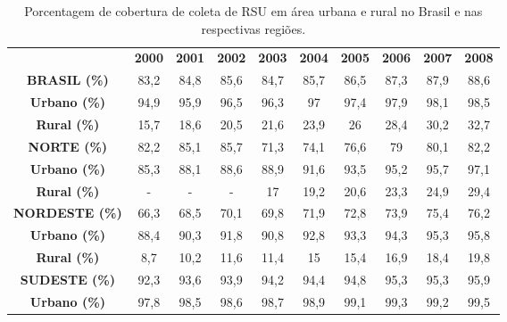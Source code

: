 \begin{table}[htbp]
  \centering
  \caption{Porcentagem de cobertura de coleta de RSU em área urbana e rural no Brasil e nas respectivas regiões.}
    \begin{tabular}{|c|c|c|c|c|c|c|c|c|c|}
\cmidrule{4-10}    \rowcolor[rgb]{ .969,  .588,  .275} \textcolor[rgb]{ 1,  1,  1}{} & \textcolor[rgb]{ 1,  1,  1}{\textbf{2000}} & \textcolor[rgb]{ 1,  1,  1}{\textbf{2001}} & \textcolor[rgb]{ 1,  1,  1}{\textbf{2002}} & \textcolor[rgb]{ 1,  1,  1}{\textbf{2003}} & \textcolor[rgb]{ 1,  1,  1}{\textbf{2004}} & \textcolor[rgb]{ 1,  1,  1}{\textbf{2005}} & \textcolor[rgb]{ 1,  1,  1}{\textbf{2006}} & \textcolor[rgb]{ 1,  1,  1}{\textbf{2007}} & \textcolor[rgb]{ 1,  1,  1}{\textbf{2008}} \\
    \rowcolor[rgb]{ .984,  .831,  .706} \textbf{BRASIL (\%)} & 83,2  & 84,8  & 85,6  & 84,7  & 85,7  & 86,5  & 87,3  & 87,9  & 88,6 \\
    \textbf{Urbano (\%)} & 94,9  & 95,9  & 96,5  & 96,3  & 97    & 97,4  & 97,9  & 98,1  & 98,5 \\
    \rowcolor[rgb]{ .992,  .914,  .851} \textbf{Rural (\%)} & 15,7  & 18,6  & 20,5  & 21,6  & 23,9  & 26    & 28,4  & 30,2  & 32,7 \\
    \rowcolor[rgb]{ .984,  .831,  .706} \textbf{NORTE (\%)} & 82,2  & 85,1  & 85,7  & 71,3  & 74,1  & 76,6  & 79    & 80,1  & 82,2 \\
    \rowcolor[rgb]{ .992,  .914,  .851} \textbf{Urbano (\%)} & 85,3  & 88,1  & 88,6  & 88,9  & 91,6  & 93,5  & 95,2  & 95,7  & 97,1 \\
    \textbf{Rural (\%)} & -     & -     & -     & 17    & 19,2  & 20,6  & 23,3  & 24,9  & 29,4 \\
    \rowcolor[rgb]{ .984,  .831,  .706} \textbf{NORDESTE  (\%)} & 66,3  & 68,5  & 70,1  & 69,8  & 71,9  & 72,8  & 73,9  & 75,4  & 76,2 \\
    \textbf{Urbano (\%)} & 88,4  & 90,3  & 91,8  & 90,8  & 92,8  & 93,3  & 94,3  & 95,3  & 95,8 \\
    \rowcolor[rgb]{ .992,  .914,  .851} \textbf{Rural (\%)} & 8,7   & 10,2  & 11,6  & 11,4  & 15    & 15,4  & 16,9  & 18,4  & 19,8 \\
    \rowcolor[rgb]{ .984,  .831,  .706} \textbf{SUDESTE (\%)} & 92,3  & 93,6  & 93,9  & 94,2  & 94,4  & 94,8  & 95,3  & 95,3  & 95,9 \\
    \rowcolor[rgb]{ .992,  .914,  .851} \textbf{Urbano (\%)} & 97,8  & 98,5  & 98,6  & 98,7  & 98,9  & 99,1  & 99,3  & 99,2  & 99,5 \\

\end{tabular}
\end{table}

